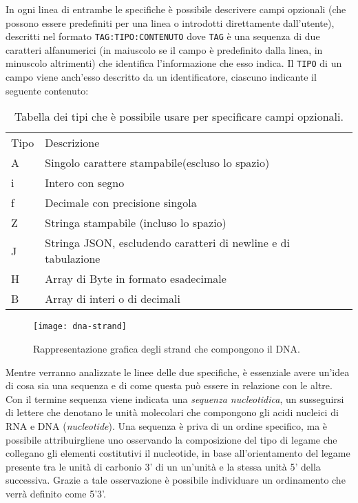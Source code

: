 In ogni linea di entrambe le specifiche è possibile descrivere campi
opzionali (che possono essere predefiniti per una linea o introdotti
direttamente dall'utente), descritti nel formato \texttt{TAG:TIPO:CONTENUTO}
dove \texttt{TAG} è una sequenza di due caratteri alfanumerici
(in maiuscolo se il campo è predefinito dalla linea, in minuscolo
altrimenti) che identifica l'informazione che esso indica.
Il \texttt{TIPO} di un campo viene anch'esso descritto da un
identificatore, ciascuno indicante il seguente contenuto:

\noindent
\begin{table}[h]
	\begin{tabularx}{\textwidth}{ | X | l | }
		\hline
		Tipo	&	Descrizione\\
		A 		&	Singolo carattere stampabile(escluso lo spazio)\\
		i 		&	Intero con segno\\
		f 		&	Decimale con precisione singola\\
		Z		&	Stringa stampabile (incluso lo spazio)\\
		J		&	Stringa JSON, escludendo caratteri di newline e di tabulazione\\
		H 		&	Array di Byte in formato esadecimale\\
		B 		&	Array di interi o di decimali\\
		\hline
	\end{tabularx}
	\caption{Tabella dei tipi che è possibile usare per specificare campi opzionali.}
	\label{tab:optfield-type}
\end{table}

\begin{wrapfigure} {O} {0.65\textwidth}
        \begin{centering}
                \texttt{[image: dna-strand]}
                \caption[Rappresentazione del DNA]{Rappresentazione grafica degli strand che compongono il DNA.}
                \label{fig:dna-strand}
        \end{centering}
\end{wrapfigure}

Mentre verranno analizzate le linee delle due specifiche, è essenziale
avere un'idea di cosa sia una sequenza e di come questa può essere in
relazione con le altre.
Con il termine sequenza viene indicata una \emph{sequenza nucleotidica},
un susseguirsi di lettere che denotano le unità molecolari che compongono
gli acidi nucleici di RNA e DNA (\emph{nucleotide}).
Una sequenza è priva di un ordine specifico, ma è possibile attribuirgliene
uno osservando la composizione del tipo di legame che collegano
gli elementi costitutivi il nucleotide, in base all'orientamento del
legame presente tra le unità di carbonio 3' di un un'unità
e la stessa unità 5' della successiva. Grazie a tale osservazione
è possibile individuare un ordinamento che verrà definito
come 5'3'.

